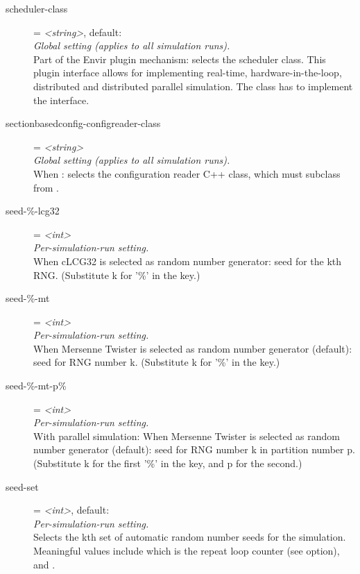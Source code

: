 \begin{description}
\item[scheduler-class] = \textit{<string>}, default: \\
    \textit{Global setting (applies to all simulation runs).}\\
    Part of the Envir plugin mechanism: selects the scheduler class. This
    plugin interface allows for implementing real-time, hardware-in-the-loop,
    distributed and distributed parallel simulation. The class has to implement
    the  interface.
\item[sectionbasedconfig-configreader-class] = \textit{<string>}\\
    \textit{Global setting (applies to all simulation runs).}\\
    When
    :
    selects the configuration reader C++ class, which must subclass from
    .
\item[seed-\%-lcg32] = \textit{<int>}\\
    \textit{Per-simulation-run setting.}\\
    When cLCG32 is selected as random number generator: seed for the kth RNG.
    (Substitute k for '\%' in the key.)
\item[seed-\%-mt] = \textit{<int>}\\
    \textit{Per-simulation-run setting.}\\
    When Mersenne Twister is selected as random number generator (default):
    seed for RNG number k. (Substitute k for '\%' in the key.)
\item[seed-\%-mt-p\%] = \textit{<int>}\\
    \textit{Per-simulation-run setting.}\\
    With parallel simulation: When Mersenne Twister is selected as random
    number generator (default): seed for RNG number k in partition number p.
    (Substitute k for the first '\%' in the key, and p for the second.)
\item[seed-set] = \textit{<int>}, default: \\
    \textit{Per-simulation-run setting.}\\
    Selects the kth set of automatic random number seeds for the simulation.
    Meaningful values include 
    which is the repeat loop counter (see  option), and
    .

\end{description}
